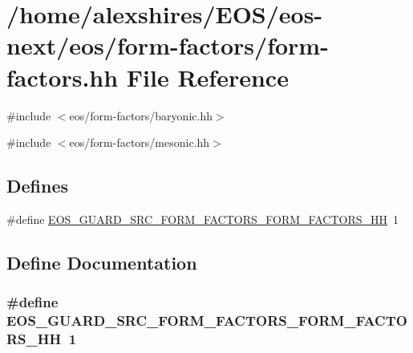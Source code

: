 \hypertarget{form-factors_8hh}{
\section{/home/alexshires/EOS/eos-\/next/eos/form-\/factors/form-\/factors.hh File Reference}
\label{form-factors_8hh}
}
{\ttfamily \#include $<$eos/form-\/factors/baryonic.hh$>$}\par
{\ttfamily \#include $<$eos/form-\/factors/mesonic.hh$>$}\par
\subsection*{Defines}
\begin{DoxyCompactItemize}
\item 
\#define \hyperlink{form-factors_8hh_adeada52e36933c7f938e4a38e6b6478d}{EOS\_\-GUARD\_\-SRC\_\-FORM\_\-FACTORS\_\-FORM\_\-FACTORS\_\-HH}~1
\end{DoxyCompactItemize}


\subsection{Define Documentation}
\hypertarget{form-factors_8hh_adeada52e36933c7f938e4a38e6b6478d}{
\subsubsection[{EOS\_\-GUARD\_\-SRC\_\-FORM\_\-FACTORS\_\-FORM\_\-FACTORS\_\-HH}]{\setlength{\rightskip}{0pt plus 5cm}\#define EOS\_\-GUARD\_\-SRC\_\-FORM\_\-FACTORS\_\-FORM\_\-FACTORS\_\-HH~1}}
\label{form-factors_8hh_adeada52e36933c7f938e4a38e6b6478d}
